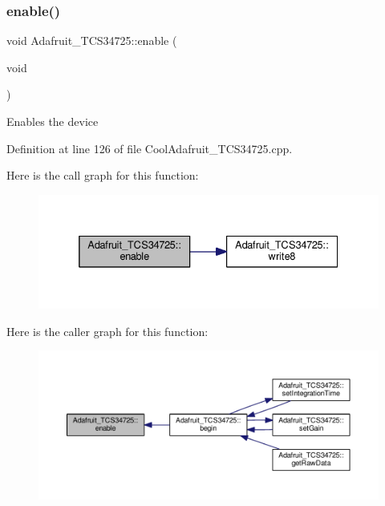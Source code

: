 \subsubsection{\texorpdfstring{enable()}{enable()}}
{\footnotesize\ttfamily void Adafruit\+\_\+\+T\+C\+S34725\+::enable (\begin{DoxyParamCaption}\item[{void}]{ }\end{DoxyParamCaption})}

Enables the device 

Definition at line 126 of file Cool\+Adafruit\+\_\+\+T\+C\+S34725.\+cpp.

Here is the call graph for this function\+:
\nopagebreak
\begin{figure}[H]
\begin{center}
\leavevmode
\includegraphics[width=332pt]{class_adafruit___t_c_s34725_ad9a0e1f4f77d32dc0a6d604f7d1d5586_cgraph}
\end{center}
\end{figure}
Here is the caller graph for this function\+:
\nopagebreak
\begin{figure}[H]
\begin{center}
\leavevmode
\includegraphics[width=350pt]{class_adafruit___t_c_s34725_ad9a0e1f4f77d32dc0a6d604f7d1d5586_icgraph}
\end{center}
\end{figure}
\mbox{\label{class_adafruit___t_c_s34725_abd9946a9baab1e0c76248cfe1864ea27}} 

